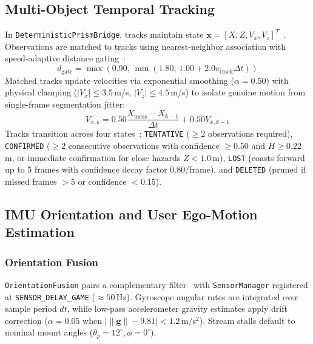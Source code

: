 \subsection{Multi-Object Temporal Tracking}
\label{sec:impl_tracking}
In \texttt{DeterministicPrismBridge}, tracks maintain state $\mathbf{x} = [X, Z, V_x, V_z]^T$~\cite{welch1995introduction}. Observations are matched to tracks using nearest-neighbor association with speed-adaptive distance gating~\cite{kuhn1955hungarian,barshalom1988tracking}:
\begin{equation}
d_{\text{gate}} = \max\left(0.90, \, \min(1.80, \, 1.00 + 2.0 v_{\text{track}} \Delta t)\right)
\label{eq:gating}
\end{equation}
Matched tracks update velocities via exponential smoothing ($\alpha = 0.50$) with physical clamping ($|V_x| \le 3.5$\,m/s, $|V_z| \le 4.5$\,m/s) to isolate genuine motion from single-frame segmentation jitter:
\begin{equation}
V_{x, k} = 0.50 \frac{X_{\text{meas}} - X_{k-1}}{\Delta t} + 0.50 V_{x, k-1}
\label{eq:vel_smooth}
\end{equation}
Tracks transition across four states~\cite{bewley2016simple,wojke2017simple}: \texttt{TENTATIVE} ($\ge 2$ observations required), \texttt{CONFIRMED} ($\ge 2$ consecutive observations with confidence $\ge 0.50$ and $H \ge 0.22$\,m, or immediate confirmation for close hazards $Z < 1.0$\,m), \texttt{LOST} (coasts forward up to 5 frames with confidence decay factor 0.80/frame), and \texttt{DELETED} (pruned if missed frames $> 5$ or confidence $< 0.15$).

\subsection{IMU Orientation and User Ego-Motion Estimation}
\label{sec:impl_imu}
\subsubsection{Orientation Fusion}
\texttt{OrientationFusion} pairs a complementary filter~\cite{mahony2008nonlinear,foxlin1996inertial,madgwick2011estimation} with \texttt{SensorManager} registered at \texttt{SENSOR\_DELAY\_GAME} ($\approx 50$\,Hz). Gyroscope angular rates are integrated over sample period $dt$, while low-pass accelerometer gravity estimates apply drift correction ($\alpha = 0.05$ when $|\|\mathbf{g}\| - 9.81| < 1.2$\,m/s$^2$). Stream stalls default to nominal mount angles ($\theta_p = 12^\circ, \phi = 0^\circ$).

